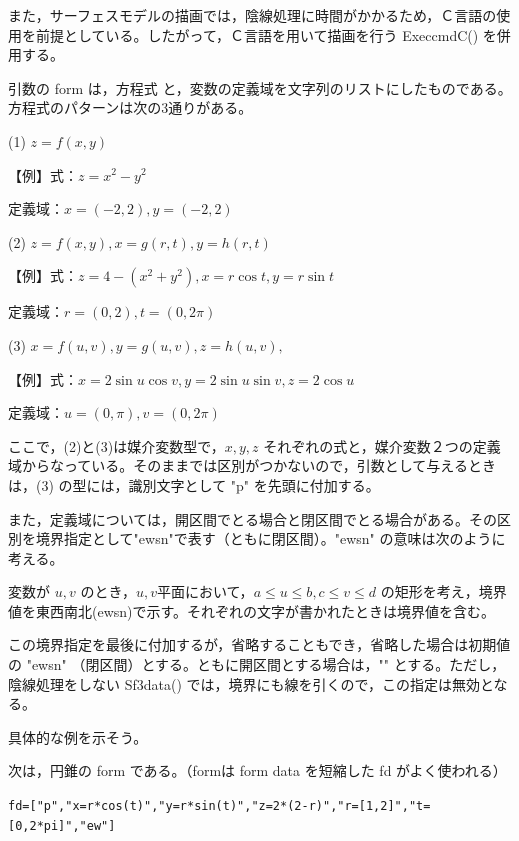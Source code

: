 \documentclass[papersize,a4paper,12pt,uplatex]{jsarticle}
\begin{document}
また，サーフェスモデルの描画では，陰線処理に時間がかかるため，Ｃ言語の使用を前提としている。したがって，Ｃ言語を用いて描画を行う ExeccmdC() を併用する。

引数の form は，方程式 と，変数の定義域を文字列のリストにしたものである。方程式のパターンは次の3通りがある。

(1) $z=f(x,y)$

 \hspace{5mm} 【例】式：$z=x^2-y^2$

 \hspace{15mm} 定義域：$x=(-2,2) , y=(-2,2)$

(2) $z=f(x,y),x=g(r,t),y=h(r,t)$

 \hspace{5mm} 【例】式：$z=4-(x^2+y^2) , x=r\cos t , y=r\sin t$ 

\hspace{15mm} 定義域：$r=(0,2) , t=(0,2\pi)$

(3) $x=f(u,v),y=g(u,v),z=h(u,v),$

 \hspace{5mm} 【例】式：$x=2\sin u \cos v , y=2\sin u \sin v, z=2\cos u $ 

\hspace{15mm} 定義域：$u=(0,\pi) , v=(0,2\pi)$

ここで，(2)と(3)は媒介変数型で，$x,y,z$ それぞれの式と，媒介変数２つの定義域からなっている。そのままでは区別がつかないので，引数として与えるときは，(3) の型には，識別文字として "p" を先頭に付加する。

また，定義域については，開区間でとる場合と閉区間でとる場合がある。その区別を境界指定として"ewsn"で表す（ともに閉区間）。"ewsn" の意味は次のように考える。

変数が $u,v$ のとき，$u,v$平面において，$a \leq u \leq b,c \leq v \leq d$ の矩形を考え，境界値を東西南北(ewsn)で示す。それぞれの文字が書かれたときは境界値を含む。

 \begin{center}  \end{center}

この境界指定を最後に付加するが，省略することもでき，省略した場合は初期値の "ewsn" （閉区間）とする。ともに開区間とする場合は，"" とする。ただし，陰線処理をしない Sf3data() では，境界にも線を引くので，この指定は無効となる。

具体的な例を示そう。

次は，円錐の form である。（formは form data を短縮した fd がよく使われる）

\vspace{\baselineskip}
\verb|fd=["p","x=r*cos(t)","y=r*sin(t)","z=2*(2-r)","r=[1,2]","t=[0,2*pi]","ew"]|
\end{document}
